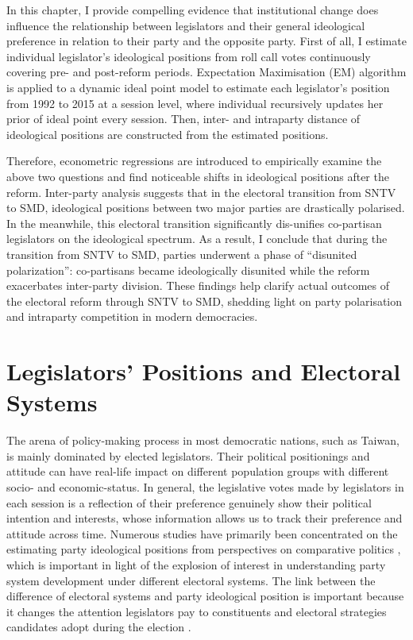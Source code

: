 In this chapter, I provide compelling evidence that institutional change does influence the relationship between legislators and their general ideological preference in relation to their party and the opposite party. First of all, I estimate individual legislator's ideological positions from roll call votes continuously covering pre- and post-reform periods. Expectation Maximisation (EM) algorithm is applied to a dynamic ideal point model to estimate each legislator's position from 1992 to 2015 at a session level, where individual recursively updates her prior of ideal point every session. Then, inter- and intraparty distance of ideological positions are constructed from the estimated positions. 

Therefore, econometric regressions are introduced to empirically examine the above two questions and find noticeable shifts in ideological positions after the reform.  Inter-party analysis suggests that in the electoral transition from SNTV to SMD, ideological positions between two major parties are drastically polarised. In the meanwhile, this electoral transition significantly dis-unifies co-partisan legislators on the ideological spectrum. As a result, I conclude that during the transition from SNTV to SMD, parties underwent a phase of ``disunited polarization'': co-partisans became ideologically disunited while the reform exacerbates inter-party division. These findings help clarify actual outcomes of the electoral reform through SNTV to SMD, shedding light on party polarisation and intraparty competition in modern democracies. 

\section*{\centering Legislators' Positions and Electoral Systems}
The arena of policy-making process in most democratic nations, such as Taiwan, is mainly dominated by elected legislators. Their political positionings and attitude can have real-life impact on different population groups with different socio- and economic-status. In general, the legislative votes made by legislators in each session is a reflection of their preference genuinely show their political intention and interests, whose information allows us to track their preference and attitude across time. Numerous studies have primarily been concentrated on the estimating party ideological positions from perspectives on comparative politics \citep[e.g.,][]{Carroll2019, Hix2009,Budge1994, Lo2014, Curini2012, Catalinac2016}, which is important in light of the explosion of interest in understanding party system development under different electoral systems. The link between the difference of electoral systems and party ideological position is important because it changes the attention legislators pay to constituents and electoral strategies candidates adopt during the election \citep[][]{Andre2015, Andre2014b, Catalinac2016, Fiva2020, Luor2008, Luor2009}. 

